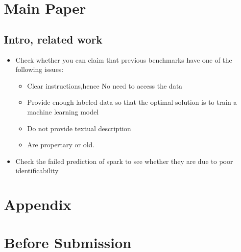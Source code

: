\documentclass[11pt]{article}
\begin{document}
\label{docstart:paper_todos}

\section*{Main Paper}

\subsection*{Intro, related work}
\begin{itemize}
\item Check whether you can claim that previous benchmarks have one of the following issues:
\begin{itemize}
    \item Clear instructions,hence No need to access the data
    \item Provide enough labeled data so that the optimal solution is to train a machine learning model
    \item Do not provide textual description
    \item Are propertary or old. 
\end{itemize}
\item Check the failed prediction of spark to see whether they are due to poor identificability
\end{itemize}
\section*{Appendix}

\section*{Before Submission}
\end{document}
